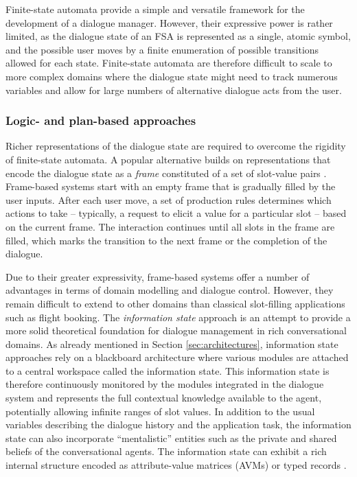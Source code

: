 Finite-state automata provide a simple and versatile framework for the development of a dialogue manager. However, their expressive power is rather limited, as the dialogue state of an FSA is represented as a single, atomic symbol, and the possible user moves by a finite enumeration of possible transitions allowed for each state.  Finite-state automata are therefore difficult to scale to more complex domains where the dialogue state might need to track numerous variables and allow for large numbers of alternative dialogue acts from the user.  

\subsubsection*{Logic- and plan-based approaches}

Richer representations of the dialogue state are required to overcome the rigidity of finite-state automata. A popular alternative builds on representations that encode the dialogue state as a \textit{frame} constituted of a set of slot-value pairs \citep{seneff2000}.  Frame-based systems start with an empty frame that is gradually filled by the user inputs.  After each user move, a set of production rules determines which actions to take  -- typically, a request to elicit a value for a particular slot -- based on the current frame.  The interaction continues until all slots in the frame are filled, which marks the transition to the next frame or the completion of the dialogue. 

Due to their greater expressivity, frame-based systems offer a number of advantages in terms of domain modelling and dialogue control.  However, they remain difficult to extend to other domains than classical slot-filling applications such as flight booking.  The \textit{information state} approach \citep{Larsson:2000} is an attempt to provide a more solid theoretical foundation for dialogue management in rich conversational domains.  As already mentioned in Section \ref{sec:architectures}, information state approaches rely on a blackboard architecture where various modules are attached to a central workspace called the information state. This information state is therefore continuously monitored by the modules integrated in the dialogue system and represents the full contextual knowledge available to the agent, potentially allowing infinite ranges of slot values. In addition to the usual variables describing the dialogue history and the application task, the information state can also incorporate ``mentalistic'' entities such as the private and shared beliefs of the conversational agents.  The information state can exhibit a rich internal structure encoded as attribute-value matrices (AVMs) or typed records  \citep{RobinCooper2012}. 

